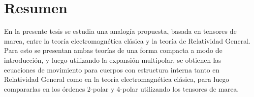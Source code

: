 \chapter*{Resumen}

En la presente tesis se estudia una analogía propuesta, basada en tensores de marea, entre la teoría electromagnética clásica y la teoría de Relatividad General. Para esto se presentan ambas teorías de una forma compacta a modo de introducción, y luego utilizando la expansión multipolar, se obtienen las ecuaciones de movimiento para cuerpos con estructura interna tanto en Relatividad General como en la teoría electromagnética clásica, para luego compararlas en los órdenes 2-polar y 4-polar utilizando los tensores de marea.